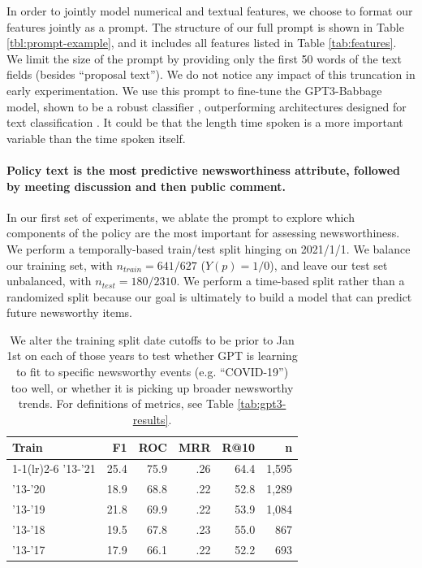 \documentclass[11pt]{article}
\begin{document}
In order to jointly model numerical and textual features, we choose to format our features jointly as a prompt. The structure of our full prompt is shown in Table \ref{tbl:prompt-example}, and it includes all features listed in Table \ref{tab:features}. We limit the size of the prompt by providing only the first 50 words of the text fields (besides ``proposal text''). We do not notice any impact of this truncation in early experimentation. We use this prompt to fine-tune the GPT3-Babbage model, shown to be a robust classifier \cite{spangher2023identifying}, outperforming architectures designed for text classification \cite{spangher2021multitask}. It could be that the length time spoken is a more important variable than the time spoken itself.

\paragraph{Policy text is the most predictive newsworthiness attribute, followed by meeting discussion and then public comment.}

In our first set of experiments, we ablate the prompt to explore which components of the policy are the most important for assessing newsworthiness.
We perform a temporally-based train/test split hinging on 2021/1/1. We balance our training set, with $n_{train}=641/627$ ($Y(p)=1/0$), and leave our test set unbalanced, with $n_{test}=180/2310$. We perform a time-based split rather than a randomized split because our goal is ultimately to build a model that can predict future newsworthy items. 

\begin{table}[t]
    \centering
    \begin{tabularx}{\linewidth}{lrrrrr}
        \toprule
         Train & F1 & ROC &  MRR & R@10 & n\\
         \cmidrule(lr){1-1}\cmidrule(lr){2-6}
         '13-'21 & 25.4 & 75.9 & .26 &  64.4 & 1,595 \\
         '13-'20 & 18.9 & 68.8 & .22 &  52.8 & 1,289 \\
         '13-'19 & 21.8 & 69.9 & .22 &  53.9 & 1,084 \\
         '13-'18 & 19.5 & 67.8 & .23 &  55.0 & 867 \\
         '13-'17 & 17.9 & 66.1 & .22 &  52.2 & 693 \\
         \bottomrule
    \end{tabularx}
    \caption{We alter the training split date cutoffs to be prior to Jan 1st on each of those years to test whether GPT is learning to fit to specific newsworthy events (e.g. ``COVID-19'') too well, or whether it is picking up broader newsworthy trends. For definitions of metrics, see Table \ref{tab:gpt3-results}.}
    \label{tbl:newsworthiness-by-time}
\end{table}
\end{document}
